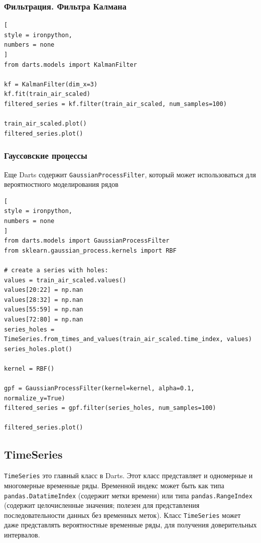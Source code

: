 \documentclass[%
	11pt,
	a4paper,
	utf8,
		]{article}
\begin{document}
\subsubsection{Фильтрация. Фильтра Калмана}

\begin{lstlisting}[
style = ironpython,
numbers = none
]
from darts.models import KalmanFilter

kf = KalmanFilter(dim_x=3)
kf.fit(train_air_scaled)
filtered_series = kf.filter(train_air_scaled, num_samples=100)

train_air_scaled.plot()
filtered_series.plot()
\end{lstlisting}

\subsubsection{Гауссовские процессы}

Еще Darts содержит \verb|GaussianProcessFilter|, который может использоваться для вероятностного моделирования рядов
\begin{lstlisting}[
style = ironpython,
numbers = none
]
from darts.models import GaussianProcessFilter
from sklearn.gaussian_process.kernels import RBF

# create a series with holes:
values = train_air_scaled.values()
values[20:22] = np.nan
values[28:32] = np.nan
values[55:59] = np.nan
values[72:80] = np.nan
series_holes = TimeSeries.from_times_and_values(train_air_scaled.time_index, values)
series_holes.plot()

kernel = RBF()

gpf = GaussianProcessFilter(kernel=kernel, alpha=0.1, normalize_y=True)
filtered_series = gpf.filter(series_holes, num_samples=100)

filtered_series.plot()
\end{lstlisting}

\subsection{TimeSeries}

\verb|TimeSeries| это главный класс в Darts. Этот класс представляет и одномерные и многомерные временные ряды. Временной индекс может быть как типа \verb|pandas.DatatimeIndex| (содержит метки времени) или типа \verb|pandas.RangeIndex| (содержит целочисленные значения; полезен для представления последовательности данных без временных меток). Класс \verb|TimeSeries| может даже представлять вероятностные временные ряды, для получения доверительных интервалов.
\end{document}
